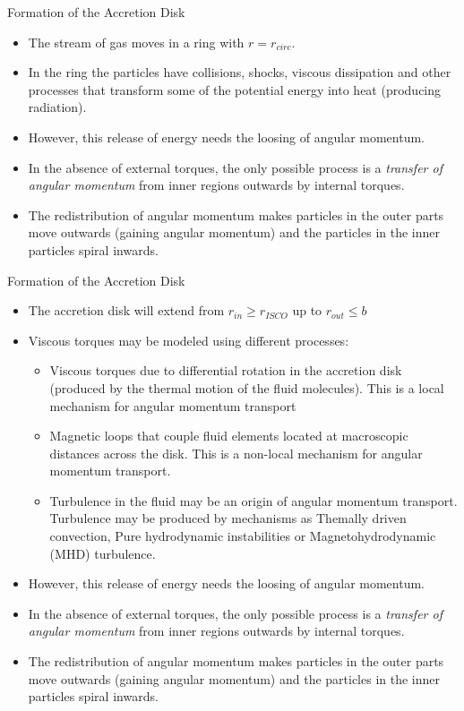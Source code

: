 \documentclass{beamer}
\begin{document}
\begin{darkframes}
\begin{frame}{Formation of the Accretion Disk}
	\begin{itemize}
	\item The stream of gas moves in a ring with $r=r_{circ}$.
	\pause
	\item In the ring the particles have collisions, shocks, viscous dissipation and other processes that transform some of the potential energy into heat (producing radiation).
	\pause
	\item However, this release of energy needs the loosing of angular momentum.
	\pause
	\item In the absence of external torques, the only possible process is a \textit{transfer of angular momentum} from inner regions outwards by internal torques.
	\pause
	\item The redistribution of angular momentum makes particles in the outer parts move outwards (gaining angular momentum) and the particles in the inner particles spiral inwards.
	\end{itemize}
\end{frame}

\begin{frame}{Formation of the Accretion Disk}
	\begin{itemize}
	\item The accretion disk will extend from $r_{in} \geq r_{ISCO}$ up to $r_{out} \leq b$
	\pause
	\item Viscous torques may be modeled using different processes:
	\begin{itemize}
	\pause
	\item Viscous torques due to differential rotation in the accretion disk (produced by the thermal motion of the fluid molecules). This is a local mechanism for angular momentum transport
	\pause
	\item Magnetic loops that couple fluid elements located at macroscopic distances across the disk. This is a non-local mechanism for angular momentum transport.
	\pause
	\item Turbulence in the fluid may be an origin of angular momentum transport. Turbulence may be produced by mechanisms as Themally driven convection, Pure hydrodynamic instabilities or Magnetohydrodynamic (MHD) turbulence.
	\end{itemize}
	
	\pause
	\item However, this release of energy needs the loosing of angular momentum.
	\pause
	\item In the absence of external torques, the only possible process is a \textit{transfer of angular momentum} from inner regions outwards by internal torques.
	\pause
	\item The redistribution of angular momentum makes particles in the outer parts move outwards (gaining angular momentum) and the particles in the inner particles spiral inwards.
	\end{itemize}
\end{frame}






\end{darkframes}
\end{document}
